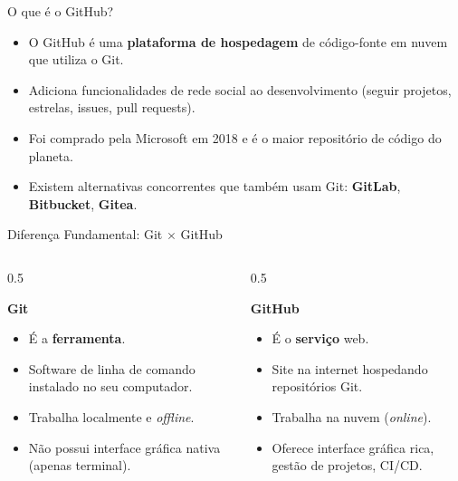 \documentclass[aspectratio=169]{beamer}
\begin{document}
\begin{frame}{O que é o GitHub?}
    \begin{itemize}
        \item O GitHub é uma \textbf{plataforma de hospedagem} de código-fonte em nuvem que utiliza o Git.
        \item Adiciona funcionalidades de rede social ao desenvolvimento (seguir projetos, estrelas, issues, pull requests).
        \item Foi comprado pela Microsoft em 2018 e é o maior repositório de código do planeta.
        \item Existem alternativas concorrentes que também usam Git: \textbf{GitLab}, \textbf{Bitbucket}, \textbf{Gitea}.
    \end{itemize}
\end{frame}

\begin{frame}{Diferença Fundamental: Git $\times$ GitHub}
    \begin{columns}
        \begin{column}{0.5\textwidth}
            \begin{center}
                \textbf{\Huge Git}
            \end{center}
            \vspace{0.2cm}
            \begin{itemize}
                \item É a \textbf{ferramenta}.
                \item Software de linha de comando instalado no seu computador.
                \item Trabalha localmente e \textit{offline}.
                \item Não possui interface gráfica nativa (apenas terminal).
            \end{itemize}
        \end{column}
        \begin{column}{0.5\textwidth}
            \begin{center}
                \textbf{\Huge GitHub}
            \end{center}
            \vspace{0.2cm}
            \begin{itemize}
                \item É o \textbf{serviço} web.
                \item Site na internet hospedando repositórios Git.
                \item Trabalha na nuvem (\textit{online}).
                \item Oferece interface gráfica rica, gestão de projetos, CI/CD.
            \end{itemize}
        \end{column}
    \end{columns}
\end{frame}
\end{document}
